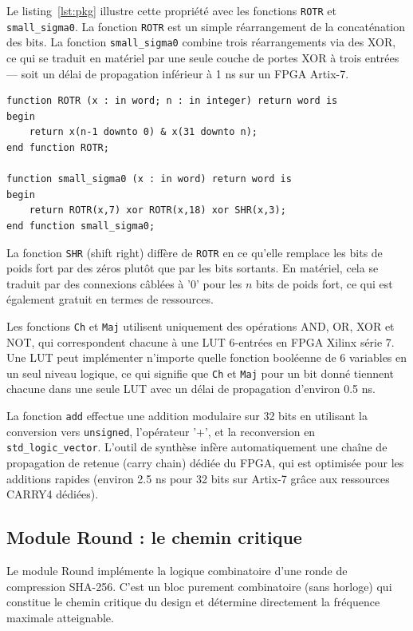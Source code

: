 Le listing~\ref{lst:pkg} illustre cette propriété avec les fonctions \texttt{ROTR} et \texttt{small\_sigma0}. La fonction \texttt{ROTR} est un simple réarrangement de la concaténation des bits. La fonction \texttt{small\_sigma0} combine trois réarrangements via des XOR, ce qui se traduit en matériel par une seule couche de portes XOR à trois entrées --- soit un délai de propagation inférieur à 1 ns sur un FPGA Artix-7.

\begin{lstlisting}[caption={Fonctions de rotation et mélange -- coût matériel quasi-nul},label={lst:pkg}]
function ROTR (x : in word; n : in integer) return word is
begin
    return x(n-1 downto 0) & x(31 downto n);
end function ROTR;

function small_sigma0 (x : in word) return word is
begin
    return ROTR(x,7) xor ROTR(x,18) xor SHR(x,3);
end function small_sigma0;
\end{lstlisting}

La fonction \texttt{SHR} (shift right) diffère de \texttt{ROTR} en ce qu'elle remplace les bits de poids fort par des zéros plutôt que par les bits sortants. En matériel, cela se traduit par des connexions câblées à '0' pour les $n$ bits de poids fort, ce qui est également gratuit en termes de ressources.

Les fonctions \texttt{Ch} et \texttt{Maj} utilisent uniquement des opérations AND, OR, XOR et NOT, qui correspondent chacune à une LUT 6-entrées en FPGA Xilinx série 7. Une LUT peut implémenter n'importe quelle fonction booléenne de 6 variables en un seul niveau logique, ce qui signifie que \texttt{Ch} et \texttt{Maj} pour un bit donné tiennent chacune dans une seule LUT avec un délai de propagation d'environ 0.5 ns.

La fonction \texttt{add} effectue une addition modulaire sur 32 bits en utilisant la conversion vers \texttt{unsigned}, l'opérateur '+', et la reconversion en \texttt{std\_logic\_vector}. L'outil de synthèse infère automatiquement une chaîne de propagation de retenue (carry chain) dédiée du FPGA, qui est optimisée pour les additions rapides (environ 2.5 ns pour 32 bits sur Artix-7 grâce aux ressources CARRY4 dédiées).

\subsection{Module Round : le chemin critique}

Le module Round implémente la logique combinatoire d'une ronde de compression SHA-256. C'est un bloc purement combinatoire (sans horloge) qui constitue le chemin critique du design et détermine directement la fréquence maximale atteignable.

